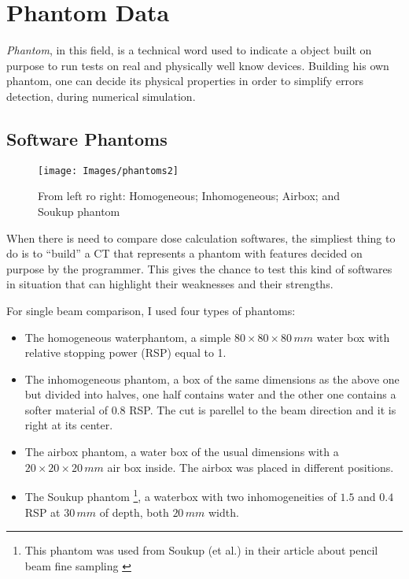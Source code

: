 \documentclass[12pt, a4paper, twoside]{book}
\begin{document}

\section{Phantom Data}\label{phantoms}
\emph{Phantom}, in this field, is a technical word used to indicate a object built on purpose to run tests on real and physically well know devices. Building his own phantom, one can decide its physical properties in order to simplify errors detection, during numerical simulation. 

\subsection{Software Phantoms}
\label{sec:pha}
\begin{figure}[h]
{\texttt{[image: Images/phantoms2]}}
\caption{From left ro right: Homogeneous; Inhomogeneous; Airbox; and Soukup phantom}
\label{fig:phantoms}
\end{figure}
When there is need to compare dose calculation softwares, the simpliest thing to do is to ``build'' a CT that represents a phantom with features decided on purpose by the programmer. This gives the chance to test this kind of softwares in situation that can highlight their weaknesses and their strengths.


For single beam comparison, I used four types of phantoms:
\begin{itemize}
\item The homogeneous waterphantom, a simple $80\times80\times80\,mm$ water box with relative stopping power (RSP) equal to 1.
\item The inhomogeneous phantom, a box of the same dimensions as the above one but divided into halves, one half contains water and the other one contains a softer material of $0.8$ RSP. The cut is parellel to the beam direction and it is right at its center.
\item The airbox phantom, a water box of the usual dimensions with a $20\times20\times20\,mm$ air box inside. The airbox was placed in different positions.
\item The Soukup phantom \footnote{This phantom was used from Soukup (et al.) in their article about pencil beam fine sampling \cite{souk:pba}}, a waterbox with two inhomogeneities of $1.5$ and $0.4$ RSP at $30\,mm$ of depth, both $20\,mm$ width.
\end{itemize}
\end{document}
